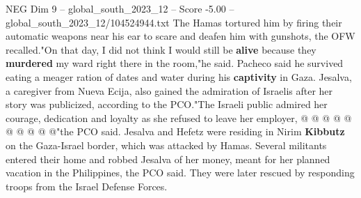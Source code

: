 \begin{textsample}{NEG Dim 9 – global\_south\_2023\_12 – Score -5.00 – global\_south\_2023\_12/104524944.txt}
The Hamas tortured him by firing their automatic weapons near his ear to scare and deafen him with gunshots, the OFW recalled."On that day, I did not think I would still be \textbf{alive} because they \textbf{murdered} my ward right there in the room,"he said.
Pacheco said he survived eating a meager ration of dates and water during his \textbf{captivity} in Gaza.
Jesalva, a caregiver from Nueva Ecija, also gained the admiration of Israelis after her story was publicized, according to the PCO."The Israeli public admired her courage, dedication and loyalty as she refused to leave her employer, @ @ @ @ @ @ @ @ @ @"the PCO said.
Jesalva and Hefetz were residing in Nirim \textbf{Kibbutz} on the Gaza-Israel border, which was attacked by Hamas.
Several militants entered their home and robbed Jesalva of her money, meant for her planned vacation in the Philippines, the PCO said.
They were later rescued by responding troops from the Israel Defense Forces.

\end{textsample}
